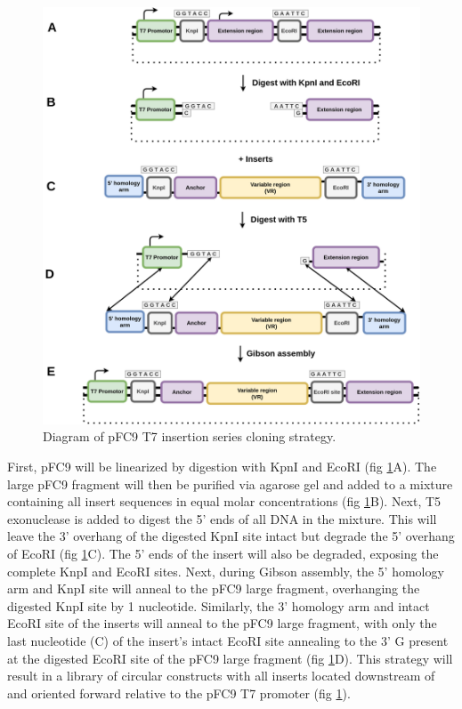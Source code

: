 \documentclass[11pt]{article}
\begin{document}
\begin{figure}[H]
	\includegraphics[width=15cm]{images/cloning_diagrams/construct_diagrams-T7-Initiation-series.png}
	\centering
	\caption{Diagram of pFC9 T7 insertion series cloning strategy.}
	\label{clone:T7-insert}
\end{figure}

First, pFC9 will be linearized by digestion with KpnI and EcoRI  (fig \ref{clone:T7-insert}A). The large pFC9 fragment will then be purified via agarose gel and added to a mixture containing all insert sequences in equal molar concentrations (fig \ref{clone:T7-insert}B). Next, T5 exonuclease is added to digest the 5' ends of all DNA in the mixture. This will leave the 3' overhang of the digested KpnI site intact but degrade the 5' overhang of EcoRI  (fig \ref{clone:T7-insert}C). The 5' ends of the insert will also be degraded, exposing the complete KnpI and EcoRI sites. Next, during Gibson assembly, the 5' homology arm and KnpI site will anneal to the pFC9 large fragment, overhanging the digested KnpI site by 1 nucleotide. Similarly, the 3' homology arm and intact EcoRI site of the inserts will anneal to the pFC9 large fragment, with only the last nucleotide (C) of the insert's intact EcoRI site annealing to the 3' G present at the digested EcoRI site of the pFC9 large fragment (fig \ref{clone:T7-insert}D). This strategy will result in a library of circular constructs with all inserts located downstream of and oriented forward relative to the pFC9 T7 promoter (fig \ref{clone:T7-insert}). 
\end{document}
